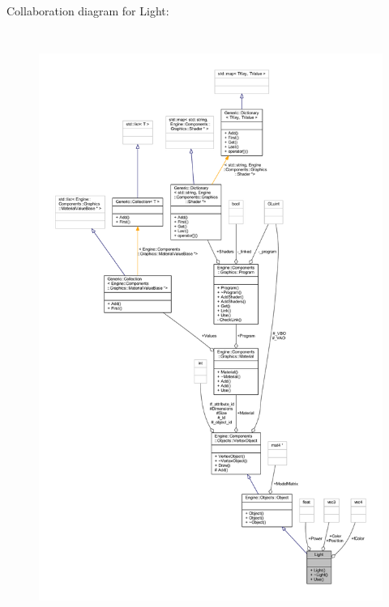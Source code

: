 Collaboration diagram for Light\+:
\nopagebreak
\begin{figure}[H]
\begin{center}
\leavevmode
\includegraphics[height=550pt]{classLight__coll__graph}
\end{center}
\end{figure}
